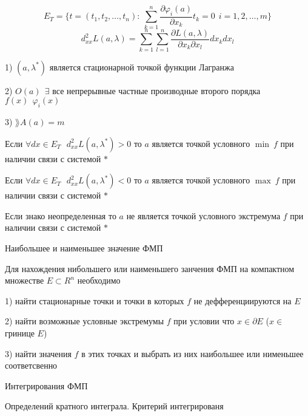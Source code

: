 \begin{define}
  $$
  E_T = \{t = (t_1, t_2, \ldots, t_n): ~ \sum_{k=1}^n
  \frac{\partial \varphi_i(a)}{\partial x_k} t_k = 0 ~~ i = 1,2,\ldots,m\}
  $$
  $$
  d_{xx}^2 L(a, \lambda) = \sum_{k=1}^n \sum_{l=1}^n
  \frac{\partial L(a, \lambda)}{\partial x_k \partial x_l} dx_k dx_l
  $$
\end{define}

\begin{block}
  1) $(a, \lambda^*)$ является стационарной точкой функции Лагранжа

  2) $O(a) ~~ \exists$ все непрерывные частные производные второго порядка
  $f(x) ~~ \varphi_i (x)$

  3) $\rang A(a) = m$

  Если $\forall dx \in E_T ~~~ d_{xx}^2 L(a, \lambda^*) > 0$ то $a$ является
  точкой условного $\min ~ f$ при наличии связи с системой $*$

  Если $\forall dx \in E_T ~~~ d_{xx}^2 L(a, \lambda^*) < 0$ то $a$ является
  точкой условного $\max ~ f$ при наличии связи с системой $*$

  Если знако неопределенная то $a$ не является точкой условного экстремума
  $f$ при наличии связи с системой $*$
\end{block}

\begin{title}[\Large]
  Наибольшее и наименьшее значение ФМП
\end{title}

\begin{block}
  Для нахождения нибольшего или наименьшего занчения ФМП на компактном
  множестве $E \subset R^n$ необходимо

  1) найти стационарные точки и точки в которых $f$ не дефференциируются на $E$

  2) найти возможные условные экстремумы $f$ при условии что $x \in \partial E$
  ($x \in$ гринице $E$)

  3) найти значения $f$ в этих точках и выбрать из них наибольшее или нименьшее
  соответсвенно
\end{block}

\begin{title}
  Интегрирования ФМП
\end{title}

\begin{title}[\Large]
  Определений кратного интеграла. Критерий интегрированя
\end{title}

